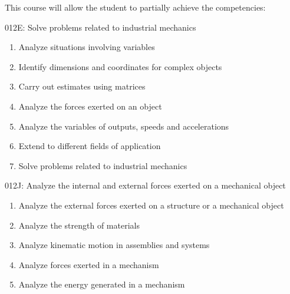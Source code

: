 {This course will allow the student to partially achieve the competencies:

012E: Solve problems related to industrial mechanics
\begin{enumerate}
\item Analyze situations involving variables
\item Identify dimensions and coordinates for complex objects
\item Carry out estimates using matrices
\item Analyze the forces exerted on an object
\item Analyze the variables of outputs, speeds and accelerations
\item Extend to different fields of application
\item Solve problems related to industrial mechanics
\end{enumerate}
\smallskip 
012J: Analyze the internal and external forces exerted on a mechanical object
\begin{enumerate}
	\item Analyze the external forces exerted on a structure or a mechanical object
	\item Analyze the strength of materials
	\item Analyze kinematic motion in assemblies and systems
	\item Analyze forces exerted in a mechanism
	\item Analyze the energy generated in a mechanism
\end{enumerate}
}